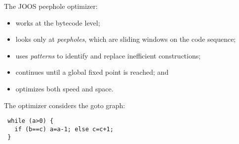 \begin{slide*}
The JOOS peephole optimizer:
\begin{itemize}
\item works at the bytecode level;
\item looks only at {\em peepholes}, which are sliding windows on the code sequence;
\item uses {\em patterns\/} to identify and replace inefficient constructions; 
\item continues until a global fixed point is reached; and
\item optimizes both speed and space.
\end{itemize}
\vfil
\end{slide*}
 
\begin{slide*}
The optimizer considers the goto graph:

\begin{scriptsize}
\begin{verbatim}
 while (a>0) {
   if (b==c) a=a-1; else c=c+1;
 }
\end{verbatim}
\end{scriptsize}


\end{slide*}
